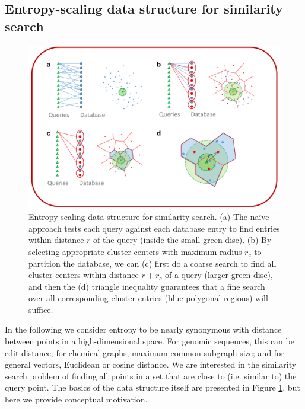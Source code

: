 \documentclass[review,preprint,12pt]{elsarticle}
\theoremstyle{definition}
\theoremstyle{remark}
\numberwithin{equation}{section}
\begin{document}
\subsection{Entropy-scaling data structure for similarity search}
\begin{figure}[btp]
    \centering
    \includegraphics[width=1\textwidth]{assets/dataStructure.png}
    \caption{ Entropy-scaling data structure for similarity search. %
            (a) The na\"ive approach tests each query against each database entry to find entries within distance $r$ of the query (inside the small green disc). %
            (b) By selecting appropriate cluster centers with maximum radius $r_c$ to partition the database, we can (c) first do a coarse search to find all cluster centers within distance $r+r_c$ of a query (larger green disc), %
 and then the (d) triangle inequality guarantees that a fine search over all corresponding cluster entries (blue polygonal regions) will suffice.}
    \label{fig:dataStructure}
\end{figure}

In the following we consider entropy to be nearly synonymous with distance between points in a high-dimensional space.
For genomic sequences, this can be edit distance; for chemical graphs, maximum common subgraph size; and for general vectors, Euclidean or cosine distance.
We are interested in the similarity search problem of
finding all points in a set that are close to (i.e. similar to) the query point.
The basics of the data structure itself are presented in Figure \ref{fig:dataStructure}, but here we provide conceptual motivation.
\end{document}
